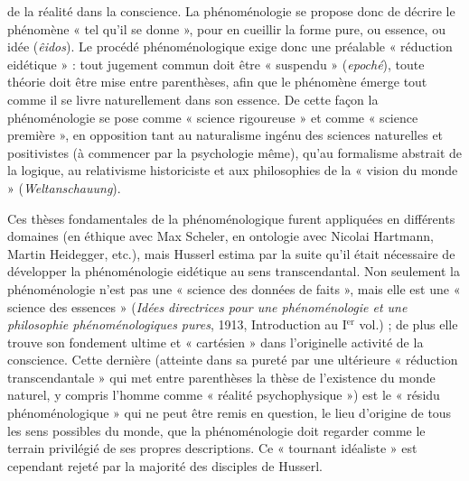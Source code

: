 de la réalité dans la conscience. La
phénoménologie se propose donc de
décrire le phénomène « tel qu’il se donne »,
pour en cueillir la forme pure, ou
essence, ou idée ({\it êidos}). Le procédé phénoménologique
exige donc une préalable
« réduction eidétique » : tout jugement
commun doit être « suspendu » ({\it epoché}),
toute théorie doit être mise entre parenthèses,
afin que le phénomène émerge
tout comme il se livre naturellement dans
son essence. De cette façon la phénoménologie
se pose comme « science rigoureuse »
et comme « science première », en
opposition tant au naturalisme ingénu des
sciences naturelles et positivistes (à
commencer par la psychologie même),
qu’au formalisme abstrait de la logique,
au relativisme historiciste et aux philosophies
de la « vision du monde » ({\it Weltanschauung}).

Ces thèses fondamentales de la phénoménologique
furent appliquées en différents
domaines (en éthique avec Max
Scheler, en ontologie avec  Nicolai
Hartmann, Martin Heidegger, etc.), mais
Husserl estima par la suite qu’il était
nécessaire de développer la phénoménologie
eidétique au sens transcendantal.
Non seulement la phénoménologie n’est
pas une « science des données de faits »,
mais elle est une « science des essences »
({\it Idées directrices pour une phénoménologie
et une philosophie phénoménologiques
pures}, 1913, Introduction au I$^\text{er}$ vol.) ; de
plus elle trouve son fondement ultime et
« cartésien » dans l’originelle activité de la
conscience. Cette dernière (atteinte dans
sa pureté par une ultérieure « réduction
transcendantale » qui met entre parenthèses
la thèse de l'existence du monde
naturel, y compris l’homme comme « réalité
psychophysique ») est le « résidu phénoménologique »
qui ne peut être remis
en question, le lieu d’origine de tous les
sens possibles du monde, que la phénoménologie
doit regarder comme le terrain
privilégié de ses propres descriptions. Ce
« tournant idéaliste » est cependant rejeté
par la majorité des disciples de Husserl.


